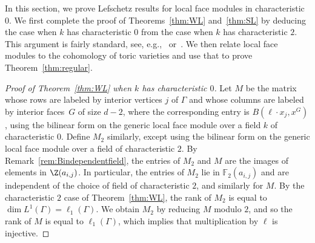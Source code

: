 In this section, we prove Lefschetz results for local face modules in characteristic $0$. We first complete the proof of Theorems~\ref{thm:WL} and~\ref{thm:SL} by deducing the case when $k$ has characteristic $0$ from the case when $k$ has characteristic $2$. This argument is fairly standard, see, e.g.,~\cite[Section 5]{KaruXiao} or~\cite[Proposition 3.5]{KLS}. 
We then relate local face modules to the cohomology of toric varieties and use that to prove Theorem~\ref{thm:regular}.

\begin{proof}[Proof of Theorem~\ref{thm:WL} when $k$ has characteristic $0$]
Let $M$ be the matrix whose rows are labeled by interior vertices $j$ of $\Gamma$ and whose columns are labeled by interior faces~$G$ of size $d-2$, where the corresponding entry is $B(\ell \cdot x_j, x^G)$, using the bilinear form on the generic local face module over a field $k$ of characteristic $0$. Define $M_2$ similarly, except using the bilinear form on the generic local face module over a field of characteristic $2$. 
By Remark~\ref{rem:Bindependentfield}, the entries of $M_2$ and $M$ are the images of elements in $\Z(a_{i,j})$. In particular, 
the entries of $M_2$ lie in $\mathbb{F}_2(a_{i,j})$ and are independent of the choice of field of characteristic $2$, and similarly for $M$. By the characteristic $2$ case of Theorem~\ref{thm:WL}, the rank of $M_2$ is equal to $\dim L^1(\Gamma) = \ell_1(\Gamma)$. We obtain $M_2$ by reducing $M$ modulo $2$, and so the rank of $M$ is equal to $\ell_1(\Gamma)$, which implies that multiplication by $\ell$ is injective. 
\end{proof}

